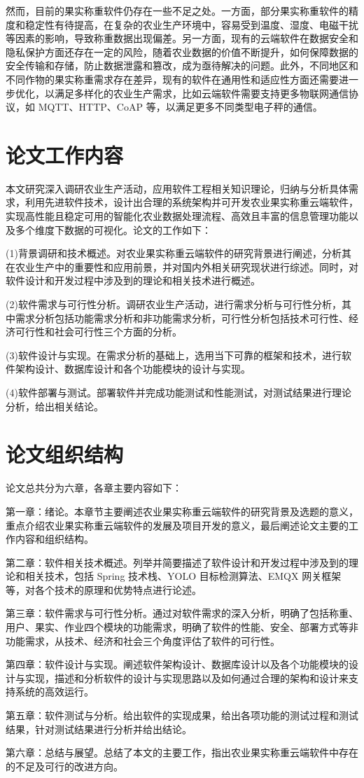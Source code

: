 然而，目前的果实称重软件仍存在一些不足之处。一方面，部分果实称重软件的精度和稳定性有待提高，在复杂的农业生产环境中，容易受到温度、湿度、电磁干扰等因素的影响，导致称重数据出现偏差\cite{汤建华2018}。另一方面，现有的云端软件在数据安全和隐私保护方面还存在一定的风险，随着农业数据的价值不断提升，如何保障数据的安全传输和存储，防止数据泄露和篡改，成为亟待解决的问题。此外，不同地区和不同作物的果实称重需求存在差异，现有的软件在通用性和适应性方面还需要进一步优化，以满足多样化的农业生产需求，比如云端软件需要支持更多物联网通信协议，如 MQTT、HTTP、CoAP 等，以满足更多不同类型电子秤的通信。

\section{论文工作内容}

本文研究深入调研农业生产活动，应用软件工程相关知识理论，归纳与分析具体需求，利用先进软件技术，设计出合理的系统架构并可开发农业果实称重云端软件，实现高性能且稳定可用的智能化农业数据处理流程、高效且丰富的信息管理功能以及多个维度下数据的可视化。论文的工作如下：

(1)背景调研和技术概述。对农业果实称重云端软件的研究背景进行阐述，分析其在农业生产中的重要性和应用前景，并对国内外相关研究现状进行综述。同时，对软件设计和开发过程中涉及到的理论和相关技术进行概述。

(2)软件需求与可行性分析。调研农业生产活动，进行需求分析与可行性分析，其中需求分析包括功能需求分析和非功能需求分析，可行性分析包括技术可行性、经济可行性和社会可行性三个方面的分析。

(3)软件设计与实现。在需求分析的基础上，选用当下可靠的框架和技术，进行软件架构设计、数据库设计和各个功能模块的设计与实现。

(4)软件部署与测试。部署软件并完成功能测试和性能测试，对测试结果进行理论分析，给出相关结论。

\section{论文组织结构}

论文总共分为六章，各章主要内容如下：

第一章：绪论。本章节主要阐述农业果实称重云端软件的研究背景及选题的意义，重点介绍农业果实称重云端软件的发展及项目开发的意义，最后阐述论文主要的工作内容和组织结构。

第二章：软件相关技术概述。列举并简要描述了软件设计和开发过程中涉及到的理论和相关技术，包括 Spring 技术栈、YOLO 目标检测算法、EMQX 网关框架等，对各个技术的原理和优势特点进行论述。

第三章：软件需求与可行性分析。通过对软件需求的深入分析，明确了包括称重、用户、果实、作业四个模块的功能需求，明确了软件的性能、安全、部署方式等非功能需求，从技术、经济和社会三个角度评估了软件的可行性。

第四章：软件设计与实现。阐述软件架构设计、数据库设计以及各个功能模块的设计与实现，描述和分析软件的设计与实现思路以及如何通过合理的架构和设计来支持系统的高效运行。

第五章：软件测试与分析。给出软件的实现成果，给出各项功能的测试过程和测试结果，针对测试结果进行分析并给出结论。

第六章：总结与展望。总结了本文的主要工作，指出农业果实称重云端软件中存在的不足及可行的改进方向。
